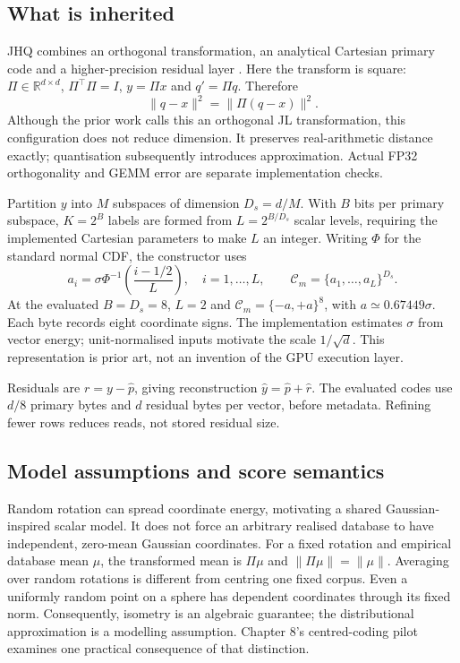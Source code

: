 \subsection{What is inherited}

JHQ combines an orthogonal transformation, an analytical Cartesian primary
code and a higher-precision residual layer \cite{jhq}. Here the transform
is square: $\Pi\in\mathbb R^{d\times d}$, $\Pi^\top\Pi=I$,
$y=\Pi x$ and $q'=\Pi q$. Therefore
\begin{equation}
 \|q-x\|^2=\|\Pi(q-x)\|^2.
 \label{eq:2-isometry}
\end{equation}
Although the prior work calls this an orthogonal JL transformation, this
configuration does not reduce dimension. It preserves real-arithmetic
distance exactly; quantisation subsequently introduces approximation.
Actual FP32 orthogonality and GEMM error are separate implementation checks.

Partition $y$ into $M$ subspaces of dimension $D_s=d/M$. With $B$ bits per
primary subspace, $K=2^B$ labels are formed from $L=2^{B/D_s}$ scalar levels,
requiring the implemented Cartesian parameters to make $L$ an integer.
Writing $\Phi$ for the standard normal CDF, the constructor uses
\begin{equation}
 a_i=\sigma\Phi^{-1}\!\left(\frac{i-1/2}{L}\right),\quad
 i=1,\ldots,L,\qquad
 \mathcal C_m=\{a_1,\ldots,a_L\}^{D_s}.
 \label{eq:2-cartesian}
\end{equation}
At the evaluated $B=D_s=8$, $L=2$ and $\mathcal C_m=\{-a,+a\}^8$,
with $a\simeq0.67449\sigma$. Each byte records eight coordinate signs.
The implementation estimates $\sigma$ from vector energy; unit-normalised
inputs motivate the scale $1/\sqrt d$. This representation is prior art,
not an invention of the GPU execution layer.

Residuals are $r=y-\widehat p$, giving reconstruction $\widehat y=\widehat p+\widehat r$. The evaluated codes use $d/8$ primary bytes and $d$ residual bytes per vector, before metadata. Refining fewer rows reduces reads, not stored residual size.

\subsection{Model assumptions and score semantics}

Random rotation can spread coordinate energy, motivating a shared
Gaussian-inspired scalar model. It does not force an arbitrary realised
database to have independent, zero-mean Gaussian coordinates. For a fixed
rotation and empirical database mean $\mu$, the transformed mean is
$\Pi\mu$ and $\|\Pi\mu\|=\|\mu\|$. Averaging over random rotations is
different from centring one fixed corpus. Even a uniformly random point on
a sphere has dependent coordinates through its fixed norm. Consequently,
isometry is an algebraic guarantee; the distributional approximation is a
modelling assumption. Chapter 8's centred-coding pilot examines one practical
consequence of that distinction.

